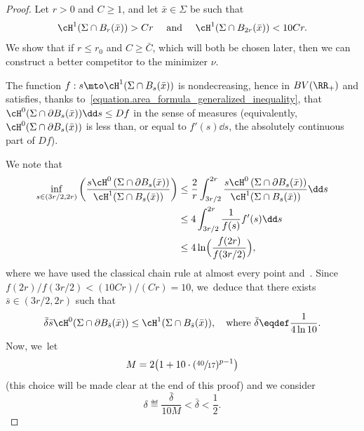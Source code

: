 \begin{proof}
Let $r> 0$ and $C\ge 1$, and let $\bar x\in\Sigma$ be such that
\begin{equation}\label{eq.bounds_length}
\cH^1(\Sigma\cap B_r(\bar x))> Cr
\quad \text{ and }\quad
\cH^1(\Sigma\cap B_{2r}(\bar x))< 10Cr.
\end{equation}
We show that if $r\le r_0$ and $C\ge \bar C$, which will both be chosen later, then we can construct a better competitor to the minimizer $\nu$.

The function $f: s \mto \cH^1(\Sigma\cap B_s(\bar x))$ is nondecreasing, hence
in $BV(\RR_+)$ and satisfies, thanks to~\eqref{equation.area_formula_generalized_inequality}, that $\cH^0(\Sigma\cap \partial B_s(\bar x))\dd s\le Df$ in the sense of measures
(equivalently, $\cH^0(\Sigma\cap\partial B_s(\bar x))$ is less than, or equal to $f'(s)\dd s$, the absolutely continuous part of $Df$).

We note that
\begin{align*}
\inf_{s \in (3r/2,2r)} \left(\frac{s\cH^0\left(\Sigma\cap\partial B_s(\bar x)\right)}{\cH^1(\Sigma\cap B_{s}(\bar x))}\right)
&\le \frac{2}{r}\int_{3r/2}^{2r}\frac{s\cH^0\left(\Sigma\cap\partial B_s(\bar x)\right)}{\cH^1(\Sigma\cap B_{ s}(\bar x))} \dd s\\
&\le 4\int_{3r/2}^{2r} \frac{1}{f(s)} f'(s)\dd s \\
&\leq 4\ln \Bigl(\frac{f(2r)}{f(3r/2)}\Bigr),
\end{align*}
where we have used the classical chain rule at almost every point and~\cite[Cor.\,3.29]{ambrosio2000functions}. Since $f(2r)/f(3r/2)<(10Cr)/(Cr)=10$, we~deduce that there exists $\bar s\in (3r/2,2r)$ such that
\begin{equation}\label{eq:estimbars}
\bar\delta \bar s\cH^0(\Sigma\cap\partial B_{\bar s}(\bar x)) \le \cH^1(\Sigma\cap B_{\bar s}(\bar x)), \quad \text{where }\bar \delta \eqdef \frac{1}{4\ln 10}.
\end{equation}
Now, we~let
\begin{equation}\label{eq:M}
M= 2 \bigl( 1+10\cdot(\sfrac{40}{17})^{p-1} \bigr)
\end{equation}
(this choice will be made clear at the end of this proof) and we consider
\begin{equation}\label{eq:delta}
\delta \eqdef \frac{\bar\delta}{10M} <\bar \delta<\frac{1}{2}.
\end{equation}


\end{proof}
